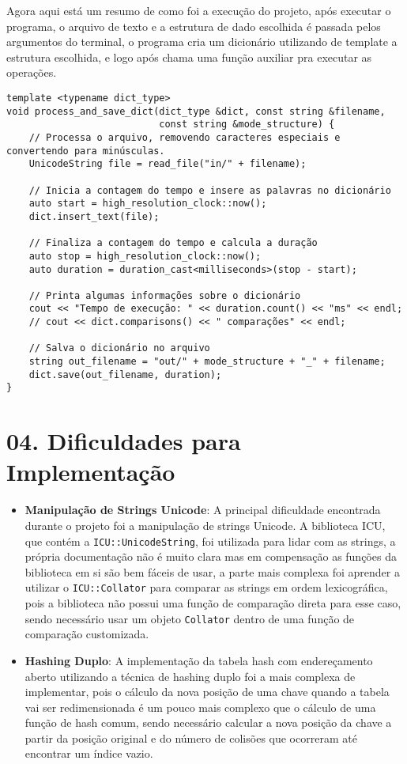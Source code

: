 \documentclass{article}
\begin{document}
Agora aqui está um resumo de como foi a execução do projeto, após executar o programa, o arquivo de texto e a estrutura de dado escolhida é passada pelos argumentos do terminal, o programa cria um dicionário utilizando de template a estrutura escolhida, e logo após chama uma função auxiliar pra executar as operações.

\begin {verbatim}
template <typename dict_type>
void process_and_save_dict(dict_type &dict, const string &filename,
                           const string &mode_structure) {
    // Processa o arquivo, removendo caracteres especiais e convertendo para minúsculas.
    UnicodeString file = read_file("in/" + filename);

    // Inicia a contagem do tempo e insere as palavras no dicionário
    auto start = high_resolution_clock::now();
    dict.insert_text(file);

    // Finaliza a contagem do tempo e calcula a duração
    auto stop = high_resolution_clock::now();
    auto duration = duration_cast<milliseconds>(stop - start);

    // Printa algumas informações sobre o dicionário
    cout << "Tempo de execução: " << duration.count() << "ms" << endl;
    // cout << dict.comparisons() << " comparações" << endl;

    // Salva o dicionário no arquivo
    string out_filename = "out/" + mode_structure + "_" + filename;
    dict.save(out_filename, duration);
}

\end{verbatim}

\section*{04. Dificuldades para Implementação}
\begin{itemize}
    \item \textbf{Manipulação de Strings Unicode}: A principal dificuldade encontrada durante o projeto foi a manipulação de strings Unicode. A biblioteca ICU, que contém a \texttt{ICU::UnicodeString}, foi utilizada para lidar com as strings, a própria documentação não é muito clara mas em compensação as funções da biblioteca em si são bem fáceis de usar, a parte mais complexa foi aprender a utilizar o \texttt{ICU::Collator} para comparar as strings em ordem lexicográfica, pois a biblioteca não possui uma função de comparação direta para esse caso, sendo necessário usar um objeto \texttt{Collator} dentro de uma função de comparação customizada.
    \item \textbf{Hashing Duplo}: A implementação da tabela hash com endereçamento aberto utilizando a técnica de hashing duplo foi a mais complexa de implementar, pois o cálculo da nova posição de uma chave quando a tabela vai ser redimensionada é um pouco mais complexo que o cálculo de uma função de hash comum, sendo necessário calcular a nova posição da chave a partir da posição original e do número de colisões que ocorreram até encontrar um índice vazio.
\end{itemize}
\end{document}
